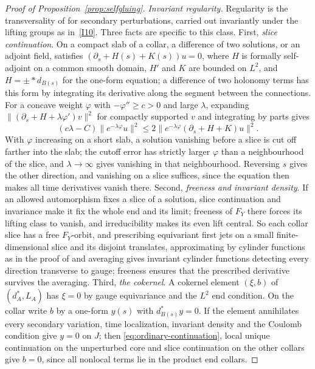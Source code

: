 \documentclass[11pt]{amsart}
\theoremstyle{definition}
\theoremstyle{remark}
\theoremstyle{plain}
\numberwithin{equation}{section}
\begin{document}
\begin{proof}[Proof of Proposition~\ref{prop:selfgluing}]
\emph{Invariant regularity.} Regularity is the transversality of
\cite[Propositions~3.8 and~3.10]{KM-unknot} for secondary perturbations,
carried out invariantly under the lifting groups as in~\ref{I10}. Three facts
are specific to this class. First, \emph{slice continuation}. On a compact
slab of a collar, a difference of two solutions, or an adjoint field,
satisfies $(\partial_s+H(s)+K(s))u=0$, where $H$ is formally self-adjoint on
a common smooth domain, $H'$ and $K$ are bounded on $L^2$, and $H=\pm*d_{B(s)}$
for the one-form equation; a difference of two holonomy terms has this form
by integrating its derivative along the segment between the connections. For
a concave weight $\varphi$ with $-\varphi''\ge c>0$ and large $\lambda$,
expanding $\|(\partial_s+H+\lambda\varphi')v\|^2$ for compactly supported $v$
and integrating by parts gives
\begin{equation}\label{eq:ordinary-continuation}
 (c\lambda-C)\|e^{-\lambda\varphi}u\|^2
 \le 2\|e^{-\lambda\varphi}(\partial_s+H+K)u\|^2 .
\end{equation}
With $\varphi$ increasing on a short slab, a solution vanishing before a
slice is cut off farther into the slab; the cutoff error has strictly larger
$\varphi$ than a neighbourhood of the slice, and $\lambda\to\infty$ gives
vanishing in that neighbourhood. Reversing
$s$ gives the other direction, and vanishing on a slice suffices, since the
equation then makes all time derivatives vanish there. Second, \emph{freeness
and invariant density}. If an allowed automorphism fixes a slice of a
solution, slice continuation and invariance make it fix the whole end and its
limit; freeness of $F_Y$ there forces its lifting class to vanish, and
irreducibility makes its even lift central. So each collar slice has a free
$F_Y$-orbit, and prescribing equivariant first jets on a small
finite-dimensional slice and its disjoint translates, approximating by
cylinder functions as in the proof of \cite[Proposition~3.10]{KM-instantons}
and averaging gives invariant cylinder functions detecting every direction
transverse to gauge; freeness ensures that the prescribed derivative survives
the averaging. Third, \emph{the cokernel}. A cokernel element $(\xi,b)$
of $(d_A^*,L_A)$ has $\xi=0$ by gauge equivariance and the $L^2$ end
condition. On the collar write $b$ by a one-form $y(s)$ with
$d_{B(s)}^*y=0$. If the element annihilates every secondary variation, time
localization, invariant density and the Coulomb condition give $y=0$ on $J$;
then \eqref{eq:ordinary-continuation}, local unique continuation on the
unperturbed core and slice continuation on the other collars give $b=0$, since
all nonlocal terms lie in the product end collars.


\end{proof}
\end{document}
